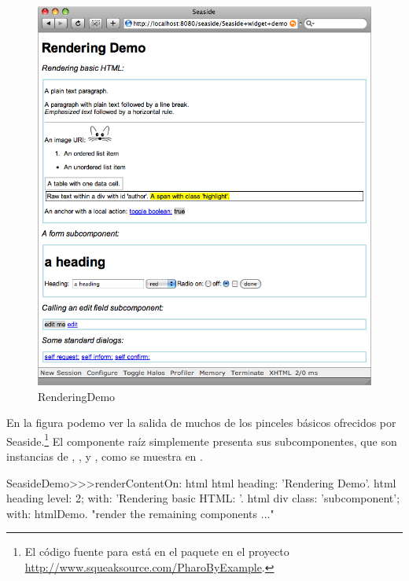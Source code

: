 \documentclass[a4paper,10pt,twoside]{book}
\begin{document}
\begin{figure}[ht]
\begin{center}
\includegraphics[width=\textwidth]{RenderingDemo}
\caption{RenderingDemo}
\end{center}
\end{figure}

En la figura  podemo ver la salida de muchos de los pinceles básicos ofrecidos por Seaside.\footnote{El código fuente para  está en el paquete  en el proyecto \url{http://www.squeaksource.com/PharoByExample}.}
El componente raíz  simplemente presenta sus subcomponentes, que son instancias de , ,  y , como se muestra en .

\needspace{7ex}
\begin{method}[renderdemo]{}
SeasideDemo>>>renderContentOn: html
	html heading: 'Rendering Demo'.
	html heading
		level: 2;
		with: 'Rendering basic HTML: '.
	html div
		class: 'subcomponent';
		with: htmlDemo.
	"render the remaining components ..."
\end{method}
\end{document}
